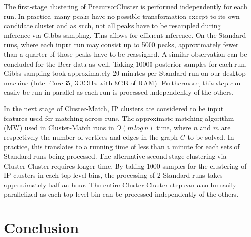 The first-stage clustering of PrecursorCluster is performed independently for each run. In practice, many peaks have no possible transformation except to its own candidate cluster and as such, not all peaks have to be resampled during inference via Gibbs sampling. This allows for efficient inference. On the Standard runs, where each input run may consist up to 5000 peaks, approximately fewer than a quarter of those peaks have to be reassigned. A similar observation can be concluded for the Beer data as well. Taking 10000 posterior samples for each run, Gibbs sampling took approximately 20 minutes per Standard run on our desktop machine (Intel Core i5, 3.3GHz with 8GB of RAM). Furthermore, this step can easily be run in parallel as each run is processed independently of the others.

In the next stage of Cluster-Match, IP clusters are considered to be input features used for matching across runs. The approximate matching algorithm (MW) used in Cluster-Match runs in $O(m\, log\, n)$ time, where $n$ and $m$ are respectively the number of vertices and edges in the graph $G$ to be solved. In practice, this translates to a running time of less than a minute for each sets of Standard runs being processed. The alternative second-stage clustering via Cluster-Cluster requires longer time. By taking 1000 samples for the clustering of IP clusters in each top-level bins, the processing of 2 Standard runs takes approximately half an hour. The entire Cluster-Cluster step can also be easily parallelized as each top-level bin can be processed independently of the others.

\section{Conclusion}

